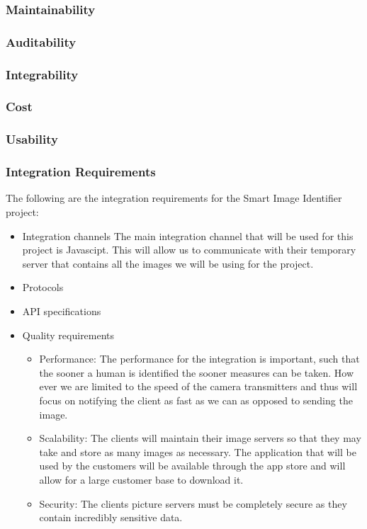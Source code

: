 \documentclass[a4paper,12pt]{report}
\begin{document}
\subsubsection{Maintainability}

\subsubsection{Auditability}

\subsubsection{Integrability}

\subsubsection{Cost}

\subsubsection{Usability}
\newpage
 \subsubsection{Integration Requirements}
 The following are the integration requirements for the Smart Image Identifier project:
 	\begin{itemize}
 		\item Integration channels The main integration channel that will be used for this project is Javascipt. This will allow us to communicate with their temporary server that contains all the images we will be using for the project.
 	\end{itemize}
	\begin{itemize}
 		\item Protocols
	\end{itemize}
	\begin{itemize}
 		\item API specifications
	\end{itemize}
	\begin{itemize}
 		\item Quality requirements
			\begin{itemize}
				\item Performance: The performance for the integration is important, such that the sooner a human is identified the sooner measures can be taken. How ever we are limited to the speed of the camera transmitters and thus will focus on notifying the client as fast as we can as opposed to sending the image.
				\item Scalability: The clients will maintain their image servers so that they may take and store as many images as necessary. The application that will be used by the customers will be available through the app store and will allow for a large customer base to download it.
				\item Security: The clients picture servers must be completely secure as they contain incredibly sensitive data.
			\end{itemize}
	\end{itemize}
	
\end{document}
